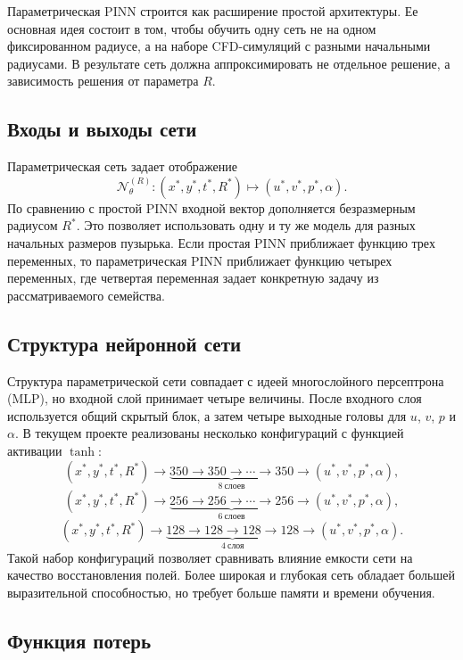 Параметрическая PINN строится как расширение простой архитектуры. Ее основная
идея состоит в том, чтобы обучить одну сеть не на одном фиксированном радиусе,
а на наборе CFD-симуляций с разными начальными радиусами. В результате сеть
должна аппроксимировать не отдельное решение, а зависимость решения от
параметра \(R\).

\subsection{Входы и выходы сети}

Параметрическая сеть задает отображение
\[
    \mathcal{N}_{\theta}^{(R)}:
    (x^*,y^*,t^*,R^*)\mapsto (u^*,v^*,p^*,\alpha).
\]
По сравнению с простой PINN входной вектор дополняется безразмерным радиусом
\(R^*\). Это позволяет использовать одну и ту же модель для разных начальных
размеров пузырька. Если простая PINN приближает функцию трех переменных, то
параметрическая PINN приближает функцию четырех переменных, где четвертая
переменная задает конкретную задачу из рассматриваемого семейства.

\subsection{Структура нейронной сети}

Структура параметрической сети совпадает с идеей многослойного персептрона (MLP), но входной слой
принимает четыре величины. После входного слоя используется общий скрытый блок,
а затем четыре выходные головы для \(u\), \(v\), \(p\) и \(\alpha\). В текущем
проекте реализованы несколько конфигураций с функцией активации \(\tanh\):
\[
    (x^*,y^*,t^*,R^*) \rightarrow
    \underbrace{350 \rightarrow 350 \rightarrow \cdots \rightarrow 350}_{8\ \text{слоев}}
    \rightarrow
    (u^*,v^*,p^*,\alpha),
\]
\[
    (x^*,y^*,t^*,R^*) \rightarrow
    \underbrace{256 \rightarrow 256 \rightarrow \cdots \rightarrow 256}_{6\ \text{слоев}}
    \rightarrow
    (u^*,v^*,p^*,\alpha),
\]
\[
    (x^*,y^*,t^*,R^*) \rightarrow
    \underbrace{128 \rightarrow 128 \rightarrow 128 \rightarrow 128}_{4\ \text{слоя}}
    \rightarrow
    (u^*,v^*,p^*,\alpha).
\]
Такой набор конфигураций позволяет сравнивать влияние емкости сети на качество
восстановления полей. Более широкая и глубокая сеть обладает большей
выразительной способностью, но требует больше памяти и времени обучения.

\subsection{Функция потерь}

